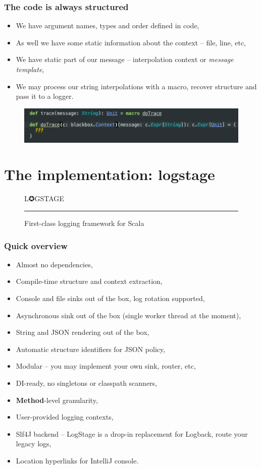 \documentclass[usenames,dvipsnames]{beamer}
\begin{document}
\begin{frame}
\frametitle{The code is always structured}
\begin{itemize}
\item We have argument names, types and order defined in code,
\item As well we have some static information about the context -- file, line, etc,
\item We have static part of our message -- interpolation context or \textit{message template},
\item We may process our string interpolations with a macro, recover structure and pass it to a logger.
\end{itemize}
\begin{figure}
    \includegraphics[width=\textwidth]{media/macro-snippet.png}
\end{figure}
\end{frame}

\section{The implementation: logstage}

\begin{frame}
\begin{figure}
\Huge 
\color{RubineRed} L✪GSTAGE
\noindent
{\color{RubineRed} \rule{\linewidth}{1mm} }
\Large First-class logging framework for Scala
\end{figure}
\end{frame}

\begin{frame}
\frametitle{Quick overview}
\begin{itemize}
\item Almost no dependencies,
\item Compile-time structure and context extraction,
\item Console and file sinks out of the box, log rotation supported,
\item Asynchronous sink out of the box (single worker thread at the moment),
\item String and JSON rendering out of the box,
\item Automatic structure identifiers for JSON policy,
\item Modular -- you may implement your own sink, router, etc,
\item DI-ready, no singletons or classpath scanners,
\item \textbf{Method}-level granularity,
\item User-provided logging contexts,
\item Slf4J backend -- LogStage is a drop-in replacement for Logback, route your legacy logs,
\item Location hyperlinks for IntelliJ console.
\end{itemize}
\end{frame}
\end{document}
